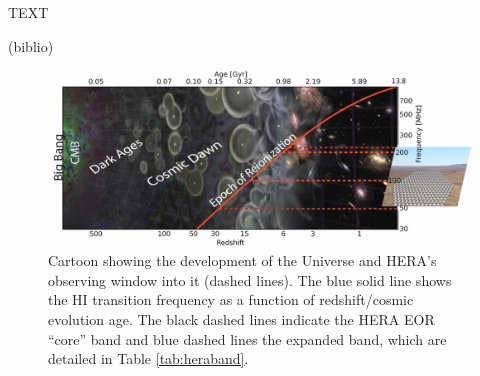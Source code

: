 \documentclass[ars]{/Users/daviddeboer1/Documents/Papers/Copernicus_LaTeX_Package_v_2_7/copernicus}
\def\HI{{H{\small I }}}
\begin{document}
\begin{acknowledgements}
TEXT
\end{acknowledgements}



(biblio)

%
%
%
%




\begin{figure}[ht]
\vspace*{2mm}
\begin{center}
\includegraphics[width=\textwidth]{plots/herauniall.png}
\end{center}
\caption{\small Cartoon showing the development of the Universe and HERA's observing window into it (dashed lines).  The blue solid
line shows the \HI transition frequency as a function of redshift/cosmic evolution age.  The black dashed lines indicate the HERA EOR ``core'' band and blue dashed lines the expanded band, which are detailed in Table \ref{tab:heraband}.}
\label{fig:theUniverse}
\end{figure}
\end{document}
